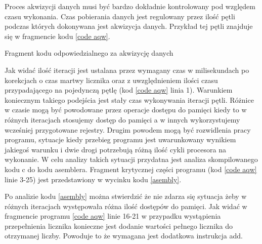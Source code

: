 Proces akwizycji danych musi być bardzo dokładnie kontrolowany pod względem czasu wykonania.
Czas pobierania danych jest regulowany przez ilość pętli podczas których dokonywana jest akwizycja danych. 
Przykład tej pętli znajduje się w fragmencie kodu \ref{code aqw}.

\begin{kod}
        
        \caption{Fragment kodu odpowiedzialnego za akwizycję danych}
        \label{code aqw}
\end{kod}

Jak widać ilość iteracji jest ustalana przez wymagany czas w milisekundach po korekcjach o czas martwy licznika oraz z uwzględnieniem ilości czasu przypadającego na pojedynczą pętlę (kod \ref{code aqw} linia 1). 
Warunkiem koniecznym takiego podejścia jest stały czas wykonywania iteracji pętli. 
Różnice w czasie mogą być powodowane przez operacje dostępu do pamięci kiedy to w różnych iteracjach stosujemy dostęp do pamięci a w innych wykorzystujemy wcześniej przygotowane rejestry.
Drugim powodem mogą być rozwidlenia pracy programu, sytuacje kiedy przebieg programu jest uwarunkowany wynikiem jakiegoś warunku i dwie drogi potrzebują różną ilość cykli procesora na wykonanie. 
W celu analizy takich sytuacji przydatna jest analiza skompilowanego kodu c do kodu asemblera.
Fragment krytycznej części programu (kod \ref{code aqw} linie 3-25) jest przedstawiony w wycinku kodu \ref{asembly}.

\begin{kod}
        Assembler},firstline=30, lastline=48]{code_source/asembler/loop_final.S}
        \caption{Fragment kodu asemblera utworzonego przez kompilację części kodu \ref{code aqw}. }
        \label{asembly}
\end{kod}

Po analizie kodu \ref{asembly} można stwierdzić że nie zdarza się sytuacja żeby w różnych iteracjach występowała różna ilość dostępów do pamięci.
Jak widać w fragmencie programu \ref{code aqw} linie 16-21 w przypadku wystąpienia przepełnienia licznika konieczne jest dodanie wartości pełnego licznika do otrzymanej liczby. 
Powoduje to że wymagana jest dodatkowa instrukcja add.

